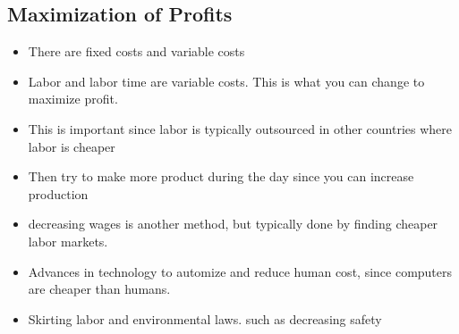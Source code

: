 \documentclass{article}
\begin{document}
\subsection{Maximization of Profits}
\begin{itemize}
  \item There are fixed costs and variable costs
  \item Labor and labor time are variable costs. This is what
    you can change to maximize profit.
  \item This is important since labor is typically outsourced in 
    other countries where labor is cheaper
  \item Then try to make more product during the day since you can increase production
  \item decreasing wages is another method, but typically done by finding cheaper
    labor markets.
  \item Advances in technology to automize and reduce human cost, since
    computers are cheaper than humans.
  \item Skirting labor and environmental laws. such as decreasing safety
\end{itemize}
\end{document}
